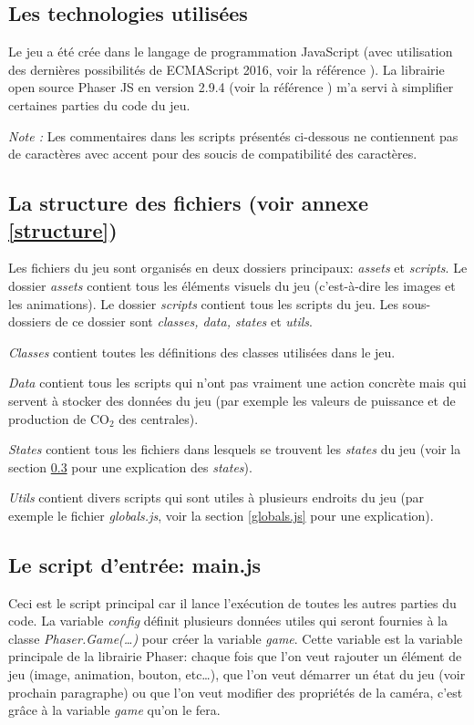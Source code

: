 \documentclass{article}
\begin{document}
        \subsection{Les technologies utilisées}
        Le jeu a été crée dans le langage de programmation JavaScript (avec utilisation des dernières possibilités de ECMAScript 2016, voir la référence \cite{ecma2016}). La librairie open source Phaser JS en version 2.9.4 (voir la référence \cite{phaser}) m'a servi à simplifier certaines parties du code du jeu.
        
        
        \textit{Note : } Les commentaires dans les scripts présentés ci-dessous ne contiennent pas de caractères avec accent pour des soucis de compatibilité des caractères.
        
        
        \subsection{La structure des fichiers (voir annexe \ref{structure})}
        Les fichiers du jeu sont organisés en deux dossiers principaux: \textit{assets} et \textit{scripts}. Le dossier \textit{assets} contient tous les éléments visuels du jeu (c'est-à-dire les images et les animations). Le dossier \textit{scripts} contient tous les scripts du jeu. Les sous-dossiers de ce dossier sont \textit{classes, data, states} et \textit{utils}.
        
        
         \textit{Classes} contient toutes les définitions des classes utilisées dans le jeu. 
         
         
         \textit{Data} contient tous les scripts qui n'ont pas vraiment une action concrète mais qui servent à stocker des données du jeu (par exemple les valeurs de puissance et de production de CO$_{2}$ des centrales).
         
         
         \textit{States} contient tous les fichiers dans lesquels se trouvent les \textit{states} du jeu (voir la section \ref{main.js} pour une explication des \textit{states}).
         
         
         \textit{Utils} contient divers scripts qui sont utiles à plusieurs endroits du jeu (par exemple le fichier \textit{globals.js}, voir la section \ref{globals.js} pour une explication).
        
       	
		\subsection{Le script d'entrée: main.js} \label{main.js}
		
		Ceci est le script principal car il lance l'exécution de toutes les autres parties du code.
		La variable \textit{config} définit plusieurs données utiles qui seront fournies à la classe \textit{Phaser.Game(\dots)} pour créer la variable \textit{game}. Cette variable est la variable principale de la librairie Phaser: chaque fois que l'on veut rajouter un élément de jeu (image, animation, bouton, etc\dots), que l'on veut démarrer un état du jeu (voir prochain paragraphe) ou que l'on veut modifier des propriétés de la caméra, c'est grâce à la variable \textit{game} qu'on le fera.
		
\end{document}
